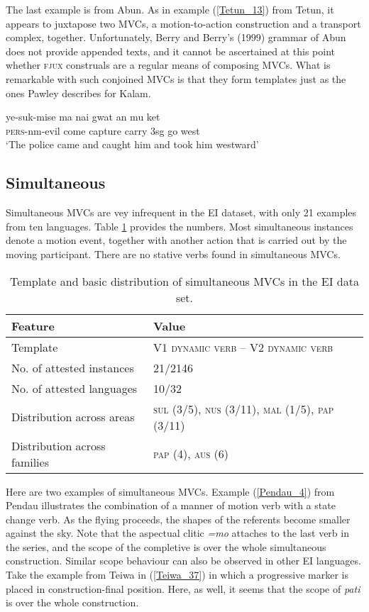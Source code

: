 The last example is from Abun. As in example (\ref{Tetun_13}) from Tetun, it appears to juxtapose two MVCs, a motion-to-action construction and a transport complex, together. Unfortunately, Berry and Berry's (1999) grammar of Abun does not provide appended texts, and it cannot be ascertained at this point whether \textsc{fjux} construals are a regular means of composing MVCs. What is remarkable with such conjoined MVCs is that they form templates just as the ones Pawley describes for Kalam.

\ea \label{Abun_4}
\gll ye-suk-mise ma nai gwat an mu ket \\
\textsc{pers}-\acs{nm}-evil come capture carry 3\acs{sg} go west \\
\glft `The police came and caught him and took him westward' \\ 
\z
\xe

\subsection{Simultaneous} \label{sec:simultaneous}

Simultaneous \textsc{MVC}s are vey infrequent in the EI dataset, with only 21 examples from ten languages. Table \ref{table:simultaneous} provides the numbers. Most simultaneous instances denote a motion event, together with another action that is carried out by the moving participant. There are no stative verbs found in simultaneous MVCs.

\begin{table}


\begin{tabular}{ll}
\lsptoprule
Feature&Value\tabularnewline
\hline
Template& V1 \textsc{dynamic verb} -- V2 \textsc{dynamic verb}\tabularnewline
No. of attested instances& 21/2146 \tabularnewline
No. of attested languages& 10/32 \tabularnewline
Distribution across areas& \textsc{sul} (3/5), \textsc{nus} (3/11), \textsc{mal} (1/5), \textsc{pap} (3/11) \tabularnewline
Distribution across families& \textsc{pap} (4), \textsc{aus} (6) \tabularnewline
\hline
\end{tabular}
\caption[Template and basic distribution of simultaneous MVCs]{Template and basic distribution of simultaneous MVCs in the EI data set.}
\label{table:simultaneous}
\end{table}


Here are two examples of simultaneous MVCs. Example (\ref{Pendau_4}) from Pendau illustrates the combination of a manner of motion verb with a state change verb. As the flying proceeds, the shapes of the referents become smaller against the sky. Note that the aspectual clitic \textit{=mo} attaches to the last verb in the series, and the scope of the completive is over the whole simultaneous construction. Similar scope behaviour can also be observed in other EI languages. Take the example from Teiwa in (\ref{Teiwa_37}) in which a progressive marker is placed in construction-final position. Here, as well, it seems that the scope of \textit{pati} is over the whole construction. 

